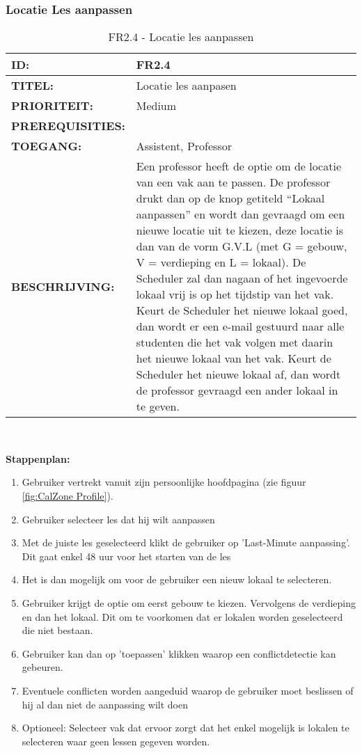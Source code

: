 \subsubsection{Locatie Les aanpassen} 
\noindent\begin{table}[H]
            \begin{tabular}{l | p{10cm}}
                \textbf{ID:} & FR2.4 \\ \hline
                \textbf{TITEL:} & Locatie les aanpasen\\ \hline
                \textbf{PRIORITEIT:} &  Medium \\ \hline
                \textbf{PREREQUISITIES:} & \\ \hline
                \textbf{TOEGANG:} & Assistent, Professor \\ \hline
                \textbf{BESCHRIJVING:} & Een professor heeft de optie om de locatie van een vak aan te passen. 
                                        De professor drukt dan op de knop getiteld “Lokaal aanpassen” en wordt dan gevraagd om een nieuwe locatie uit te kiezen, deze locatie is dan van de vorm G.V.L (met G = gebouw, V = verdieping en L = lokaal). De Scheduler zal dan nagaan of het ingevoerde lokaal vrij is op het tijdstip van het vak. Keurt de Scheduler het nieuwe lokaal goed, dan wordt er een e-mail gestuurd naar alle studenten die het vak volgen met daarin het nieuwe lokaal van het vak. Keurt de Scheduler het nieuwe lokaal af, dan wordt de professor gevraagd een ander lokaal in te geven.\\ 
            \end{tabular}\\
            \caption{FR2.4 - Locatie les aanpassen}
            \label{tab:FR2.4 - Locatie les aanpassen}
        \end{table}
        
\textbf{Stappenplan:}
	\begin{enumerate}
	\item Gebruiker vertrekt vanuit zijn persoonlijke hoofdpagina (zie figuur \ref{fig:CalZone Profile}).
	\item Gebruiker selecteer les dat hij wilt aanpassen
	\item Met de juiste les geselecteerd klikt de gebruiker op 'Last-Minute aanpassing'. Dit gaat enkel 48 uur voor het starten van de les
	\item Het is dan mogelijk om voor de gebruiker een nieuw lokaal te selecteren.
	\item Gebruiker krijgt de optie om eerst gebouw te kiezen. Vervolgens de verdieping en dan het lokaal. Dit om te voorkomen dat er lokalen worden geselecteerd die niet bestaan.
	\item Gebruiker kan dan op 'toepassen' klikken waarop een conflictdetectie kan gebeuren.
	\item Eventuele conflicten worden aangeduid waarop de gebruiker moet beslissen of hij al dan niet de aanpassing wilt doen 
	\item Optioneel: Selecteer vak dat ervoor zorgt dat het enkel mogelijk is lokalen te selecteren waar geen lessen gegeven worden.
	\end{enumerate}	        
        
